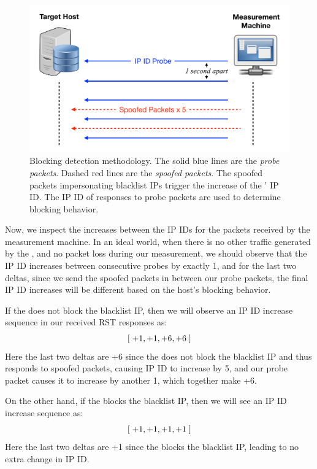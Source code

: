 \begin{figure}[t]
\centering
\includegraphics[width=0.85\columnwidth]{images/croped_design_implementation.pdf}
\caption{Blocking detection methodology. The solid blue lines are the \textit{probe
packets}. Dashed red lines are the \textit{spoofed packets}. The spoofed
packets impersonating blacklist IPs trigger the increase of the
{}' IP ID. The IP ID of responses to probe packets are used to
determine blocking behavior.}
\label{fig:design_implementation}
\end{figure}

Now, we inspect the increases between the IP IDs for the packets received by the
measurement machine. In an ideal world, when there is no other traffic
generated by the {}, and no packet loss during our measurement, we
should observe that the IP ID increases between consecutive probes by exactly
1, and for the last two deltas, since we send the spoofed packets in between
our probe packets, the final IP ID increases will be different based on the
host's blocking behavior.

If the {} does not block the blacklist IP, then
we will observe an IP ID increase sequence in our received RST responses as:
\[[\hspace{0.1cm} +1, +1, +6, +6 \hspace{0.1cm}]\]
Here the last two deltas are +6 since the {} does not block the
blacklist IP and thus responds to spoofed packets, causing IP ID to increase by
5, and our probe packet causes it to increase by another 1, which together make +6.

On the other hand, if the {} blocks the blacklist IP, then we will see an IP
ID increase sequence as:
\[ [\hspace{0.1cm} +1, +1, +1, +1 \hspace{0.1cm}] \]
Here the last two deltas are +1 since the {} blocks the blacklist IP,
leading to no extra change in IP ID.

